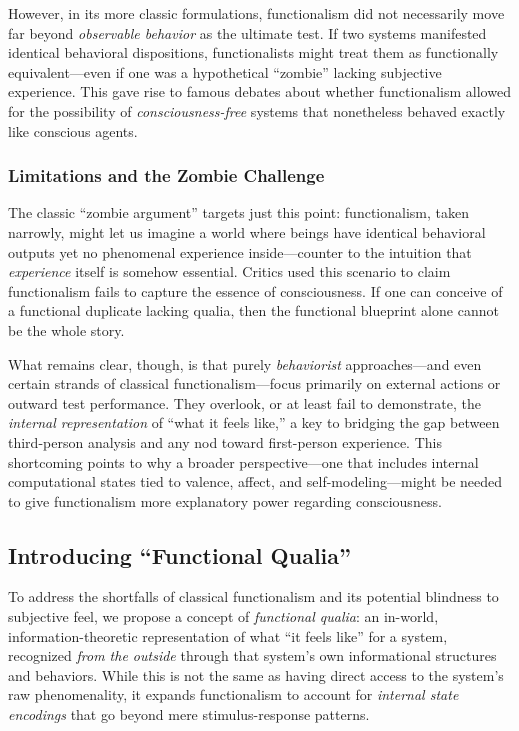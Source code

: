 \documentclass[12pt]{article}
\begin{document}
However, in its more classic formulations, functionalism did not necessarily move far beyond \textit{observable behavior} as the ultimate test. If two systems manifested identical behavioral dispositions, functionalists might treat them as functionally equivalent---even if one was a hypothetical ``zombie'' lacking subjective experience. This gave rise to famous debates about whether functionalism allowed for the possibility of \textit{consciousness-free} systems that nonetheless behaved exactly like conscious agents.

\subsubsection{Limitations and the Zombie Challenge}

The classic ``zombie argument'' targets just this point: functionalism, taken narrowly, might let us imagine a world where beings have identical behavioral outputs yet no phenomenal experience inside---counter to the intuition that \textit{experience} itself is somehow essential. Critics used this scenario to claim functionalism fails to capture the essence of consciousness. If one can conceive of a functional duplicate lacking qualia, then the functional blueprint alone cannot be the whole story.

What remains clear, though, is that purely \textit{behaviorist} approaches---and even certain strands of classical functionalism---focus primarily on external actions or outward test performance. They overlook, or at least fail to demonstrate, the \textit{internal representation} of ``what it feels like,'' a key to bridging the gap between third-person analysis and any nod toward first-person experience. This shortcoming points to why a broader perspective---one that includes internal computational states tied to valence, affect, and self-modeling---might be needed to give functionalism more explanatory power regarding consciousness.

\subsection{Introducing ``Functional Qualia''}

To address the shortfalls of classical functionalism and its potential blindness to subjective feel, we propose a concept of \textit{functional qualia}: an in-world, information-theoretic representation of what ``it feels like'' for a system, recognized \textit{from the outside} through that system's own informational structures and behaviors. While this is not the same as having direct access to the system's raw phenomenality, it expands functionalism to account for \textit{internal state encodings} that go beyond mere stimulus-response patterns.
\end{document}
